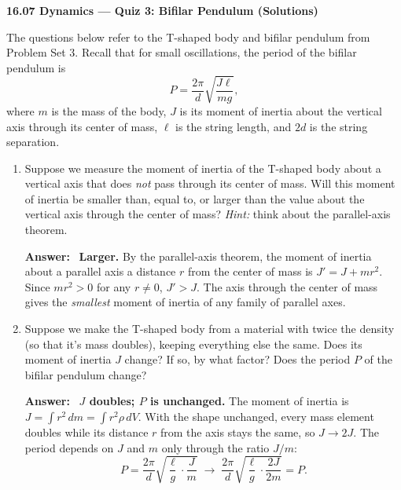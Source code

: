 \documentclass[11pt,letterpaper]{article}
\newenvironment{answer}{\par\vspace{4pt}\color{blue!60!black}\textbf{Answer:}\ }{\par\vspace{4pt}}
\begin{document}
\begin{center}
    {\Large \textbf{16.07 Dynamics --- Quiz 3: Bifilar Pendulum (Solutions)}}\\[4pt]
\end{center}

\vspace{4pt}
The questions below refer to the T-shaped body and bifilar pendulum from Problem Set 3. Recall that for small oscillations, the period of the bifilar pendulum is
\[
P = \frac{2\pi}{d}\sqrt{\frac{J\ell}{mg}},
\]
where $m$ is the mass of the body, $J$ is its moment of inertia about the vertical axis through its center of mass, $\ell$ is the string length, and $2d$ is the string separation.

\vspace{10pt}
\begin{enumerate}[label=\textbf{\arabic*.}, leftmargin=*, itemsep=4pt]

\item Suppose we measure the moment of inertia of the T-shaped body about a vertical axis that does \emph{not} pass through its center of mass. Will this moment of inertia be smaller than, equal to, or larger than the value about the vertical axis through the center of mass? \emph{Hint:} think about the parallel-axis theorem.

\begin{answer}
\textbf{Larger.} By the parallel-axis theorem, the moment of inertia about a parallel axis a distance $r$ from the center of mass is $J' = J + m r^2$. Since $m r^2 > 0$ for any $r \neq 0$, $J' > J$. The axis through the center of mass gives the \emph{smallest} moment of inertia of any family of parallel axes.
\end{answer}

\item Suppose we make the T-shaped body from a material with twice the density (so that it's mass doubles), keeping everything else the same. Does its moment of inertia $J$ change? If so, by what factor? Does the period $P$ of the bifilar pendulum change?

\begin{answer}
\textbf{$J$ doubles; $P$ is unchanged.} The moment of inertia is $J = \int r^2\,dm = \int r^2 \rho\,dV$. With the shape unchanged, every mass element doubles while its distance $r$ from the axis stays the same, so $J \to 2J$. The period depends on $J$ and $m$ only through the ratio $J/m$:
\[
P = \frac{2\pi}{d}\sqrt{\frac{\ell}{g}\cdot\frac{J}{m}} \;\to\; \frac{2\pi}{d}\sqrt{\frac{\ell}{g}\cdot\frac{2J}{2m}} = P .
\]
\end{answer}


\end{enumerate}
\end{document}
